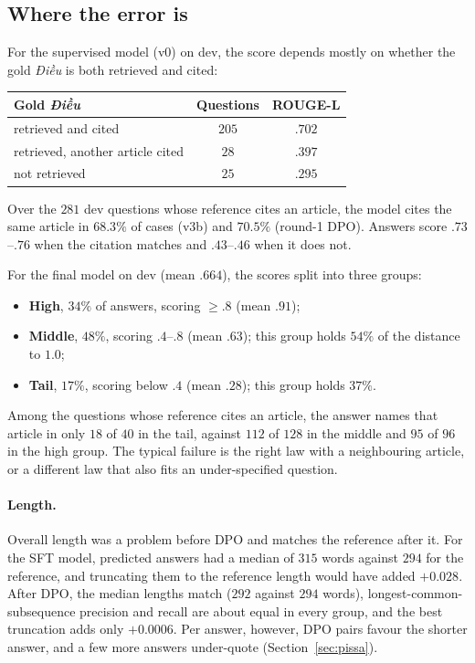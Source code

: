 \documentclass[11pt,a4paper]{article}
\newcommand{\rl}{ROUGE-L}
\newcommand{\dieu}{\textit{Điều}}
\begin{document}
\subsection{Where the error is}\label{sec:where}
For the supervised model (v0) on dev, the score depends mostly on whether the gold \dieu{} is both retrieved and cited:

\begin{center}
\small
\begin{tabular}{@{}lcc@{}}
\toprule
Gold \dieu{} & Questions & \rl{}\\
\midrule
retrieved and cited & $205$ & $.702$\\
retrieved, another article cited & $28$ & $.397$\\
not retrieved & $25$ & $.295$\\
\bottomrule
\end{tabular}
\end{center}

\noindent Over the $281$ dev questions whose reference cites an article, the model cites the same article in $68.3\%$ of cases (v3b) and $70.5\%$ (round-1 DPO). Answers score $.73$--$.76$ when the citation matches and $.43$--$.46$ when it does not.

For the final model on dev (mean $.664$), the scores split into three groups:
\begin{itemize}[leftmargin=*]
\item \textbf{High}, $34\%$ of answers, scoring $\ge.8$ (mean $.91$);
\item \textbf{Middle}, $48\%$, scoring $.4$--$.8$ (mean $.63$); this group holds $54\%$ of the distance to $1.0$;
\item \textbf{Tail}, $17\%$, scoring below $.4$ (mean $.28$); this group holds $37\%$.
\end{itemize}
Among the questions whose reference cites an article, the answer names that article in only $18$ of $40$ in the tail, against $112$ of $128$ in the middle and $95$ of $96$ in the high group. The typical failure is the right law with a neighbouring article, or a different law that also fits an under-specified question.

\paragraph{Length.}
Overall length was a problem before DPO and matches the reference after it. For the SFT model, predicted answers had a median of $315$ words against $294$ for the reference, and truncating them to the reference length would have added $+0.028$. After DPO, the median lengths match ($292$ against $294$ words), longest-common-subsequence precision and recall are about equal in every group, and the best truncation adds only $+0.0006$. Per answer, however, DPO pairs favour the shorter answer, and a few more answers under-quote (Section~\ref{sec:pissa}).
\end{document}
